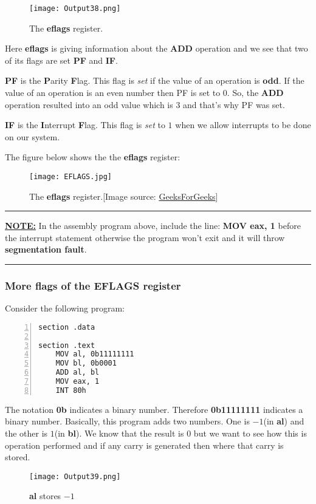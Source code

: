 \documentclass{article}
\makeatletter
\renewcommand\paragraph{\@startsection{paragraph}{4}{\z@}{-3.25ex \@plus -1ex \@minus -.2ex}{1.5ex \@plus .2ex}{\normalfont\normalsize\bfseries}}
\makeatother
\begin{document}
\begin{figure}[h]
\centering
\texttt{[image: Output38.png]}
\caption{The \textbf{eflags} register.}
\label{fig:fig4}
\end{figure}

Here \textbf{eflags} is giving information about the \textbf{ADD} operation and we see that two of its flags are set \textbf{PF} and \textbf{IF}.

\vspace{10pt}
\textbf{PF} is the \textbf{P}arity \textbf{F}lag. This flag is \textit{set} if the value of an operation is \textbf{odd}. If the value of an operation is an even number then PF is set to $0$. So, the \textbf{ADD} operation resulted into an odd value which is $3$ and that's why PF was set.

\vspace{10pt}
\textbf{IF} is the \textbf{I}nterrupt \textbf{F}lag. This flag is \textit{set} to $1$ when we allow interrupts to be done on our system.

The figure below shows the the \textbf{eflags} register:
\begin{figure}[h]
\centering
\texttt{[image: EFLAGS.jpg]}
\caption{The \textbf{eflags} register.[Image source: \href{https://www.geeksforgeeks.org/eflags-registers-of-80386-microprocessor/}{GeeksForGeeks}]}
\label{fig:fig5}
\end{figure}

\rule{\linewidth}{5pt}
\underline{\textbf{NOTE:}} In the assembly program above, include the line: \textbf{MOV eax, 1} before the interrupt statement otherwise the program won't exit and it will throw \textbf{segmentation fault}.

\rule{\linewidth}{5pt}
\newpage
\subsubsection{More flags of the EFLAGS register}\label{sec:subsubsec2}
\paragraph{}
Consider the following program:
\begin{Verbatim}[numbers=left, frame=single]
section .data

section .text
	MOV al, 0b11111111
	MOV bl, 0b0001
	ADD al, bl
	MOV eax, 1
	INT 80h
\end{Verbatim}
The notation \textbf{0b} indicates a binary number. Therefore \textbf{0b11111111} indicates a binary number. Basically, this program adds two numbers. One is $-1$(in \textbf{al}) and the other is $1$(in \textbf{bl}). We know that the result is $0$ but we want to see how this is operation performed and if any carry is generated then where that carry is stored.
\begin{figure}[h]
\centering
\texttt{[image: Output39.png]}
\caption{\textbf{al} stores $-1$}
\label{fig:fig6}
\end{figure}
\end{document}
